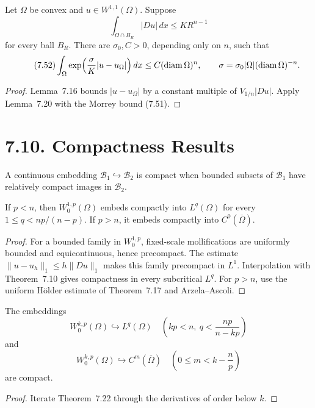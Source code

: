 \begin{theorem}
\label{gt:thm-sobolev-john-nirenberg}
Let $\Omega$ be convex and $u\in W^{1,1}(\Omega)$. Suppose
\begin{equation}
\tag{7.51}
\int_{\Omega\cap B_R}|Du|\,dx\leq KR^{n-1}
\end{equation}
for every ball $B_R$. There are $\sigma_0,C>0$, depending only on $n$, such
that
\begin{equation}
\tag{7.52}
\int_\Omega\exp\!\left(\frac\sigma K|u-u_\Omega|\right)dx
\leq C(\operatorname{diam}\Omega)^n,
\qquad
\sigma=\sigma_0|\Omega|(\operatorname{diam}\Omega)^{-n}.
\end{equation}
\end{theorem}
\begin{proof}
\sketch Lemma~7.16 bounds $|u-u_\Omega|$ by a constant multiple of
$V_{1/n}|Du|$. Apply Lemma~7.20 with the Morrey bound (7.51).
\end{proof}

\section*{7.10. Compactness Results}

A continuous embedding $\mathcal B_1\hookrightarrow\mathcal B_2$ is compact
when bounded subsets of $\mathcal B_1$ have relatively compact images in
$\mathcal B_2$.

\begin{theorem}
\label{gt:thm-sobolev-kondrachov}
If $p<n$, then $W_0^{1,p}(\Omega)$ embeds compactly into $L^q(\Omega)$ for
every $1\leq q<np/(n-p)$. If $p>n$, it embeds compactly into
$C^0(\overline\Omega)$.
\end{theorem}
\begin{proof}
\sketch For a bounded family in $W_0^{1,p}$, fixed-scale mollifications are
uniformly bounded and equicontinuous, hence precompact. The estimate
$\|u-u_h\|_1\leq h\|Du\|_1$ makes this family precompact in $L^1$.
Interpolation with Theorem~7.10 gives compactness in every subcritical
$L^q$. For $p>n$, use the uniform H\"older estimate of Theorem~7.17 and
Arzela--Ascoli.
\end{proof}

\begin{corollary}
\label{gt:cor-sobolev-kondrachov-higher-order}
The embeddings
\[
W_0^{k,p}(\Omega)\hookrightarrow L^q(\Omega)
\quad\left(kp<n,\ q<\frac{np}{n-kp}\right)
\]
and
\[
W_0^{k,p}(\Omega)\hookrightarrow C^m(\overline\Omega)
\quad\left(0\leq m<k-\frac np\right)
\]
are compact.
\end{corollary}
\begin{proof}
\sketch Iterate Theorem~7.22 through the derivatives of order below $k$.
\end{proof}


